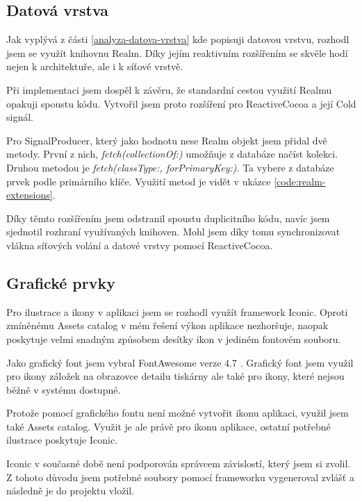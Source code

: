 \subsection{Datová vrstva}

Jak vyplývá z části \ref{analyza-datova-vrstva} kde popisuji datovou vrstvu, rozhodl jsem se využít knihovnu Realm.
Díky jejím reaktivním rozšířením se skvěle hodí nejen k architektuře, ale i k síťové vrstvě.

Při implementaci jsem dospěl k závěru, že standardní cestou využití Realmu opakuji spoustu kódu.
Vytvořil jsem proto rozšíření pro ReactiveCocoa a její Cold signál.

Pro SignalProducer, který jako hodnotu nese Realm objekt jsem přidal dvě metody.
První z nich, \textit{fetch(collectionOf:)} umožňuje z databáze načíst kolekci.
Druhou metodou je \textit{fetch(classType:, forPrimaryKey:)}.
Ta vybere z databáze prvek podle primárního klíče.
Využití metod je vidět v ukázce \ref{code:realm-extensions}.


Díky těmto rozšířením jsem odstranil spoustu duplicitního kódu, navíc jsem sjednotil rozhraní využívaných knihoven.
Mohl jsem díky tomu synchronizovat vlákna síťových volání a datové vrstvy pomocí ReactiveCocoa.

\subsection{Grafické prvky}

Pro ilustrace a ikony v aplikaci jsem se rozhodl využít framework Iconic.
Oproti zmíněnému Assets catalog v mém řešení výkon aplikace nezhoršuje, naopak poskytuje velmi snadným způsobem desítky ikon v jediném fontovém souboru.

Jako grafický font jsem vybral FontAwesome verze 4.7 \cite{fontawesome-web}.
Grafický font jsem využil pro ikony záložek na obrazovce detailu tiskárny ale také pro ikony, které nejsou běžně v systému dostupné.

Protože pomocí grafického fontu není možné vytvořit ikonu aplikaci, využil jsem také Assets catalog.
Využit je ale právě pro ikonu aplikace, ostatní potřebné ilustrace poskytuje Iconic.

Iconic v současné době není podporován správcem závislostí, který jsem si zvolil.
Z tohoto důvodu jsem potřebné soubory pomocí frameworku vygeneroval zvlášť a následně je do projektu vložil.


